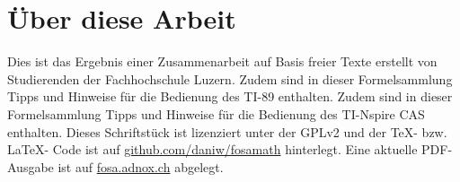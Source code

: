 \chapter*{Über diese Arbeit}
Dies ist das Ergebnis einer Zusammenarbeit auf Basis freier Texte erstellt von Studierenden der Fachhochschule Luzern. 
\ifti
Zudem sind in dieser Formelsammlung Tipps und Hinweise für die Bedienung des TI-89 enthalten. 
\fi
\ifnspire
Zudem sind in dieser Formelsammlung Tipps und Hinweise für die Bedienung des TI-Nspire CAS enthalten. 
\fi
Dieses Schriftstück ist lizenziert unter der GPLv2 und der \TeX-  bzw. \LaTeX- Code ist auf \url{github.com/daniw/fosamath} hinterlegt.
Eine aktuelle PDF-Ausgabe ist auf \url{fosa.adnox.ch} abgelegt. 
